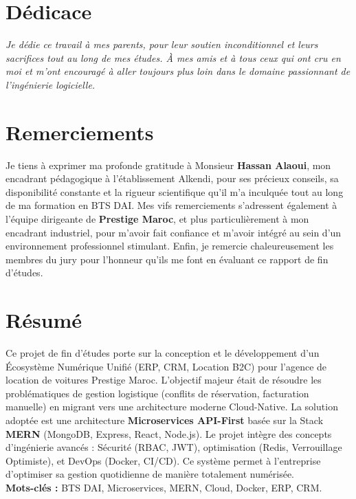 
\chapter*{Dédicace}
\textit{Je dédie ce travail à mes parents, pour leur soutien inconditionnel et leurs sacrifices tout au long de mes études. À mes amis et à tous ceux qui ont cru en moi et m'ont encouragé à aller toujours plus loin dans le domaine passionnant de l'ingénierie logicielle.}

\chapter*{Remerciements}
Je tiens à exprimer ma profonde gratitude à Monsieur \textbf{Hassan Alaoui}, mon encadrant pédagogique à l'établissement Alkendi, pour ses précieux conseils, sa disponibilité constante et la rigueur scientifique qu'il m'a inculquée tout au long de ma formation en BTS DAI.
Mes vifs remerciements s'adressent également à l'équipe dirigeante de \textbf{Prestige Maroc}, et plus particulièrement à mon encadrant industriel, pour m'avoir fait confiance et m'avoir intégré au sein d'un environnement professionnel stimulant. Enfin, je remercie chaleureusement les membres du jury pour l'honneur qu'ils me font en évaluant ce rapport de fin d'études.

\chapter*{Résumé}
Ce projet de fin d'études porte sur la conception et le développement d'un Écosystème Numérique Unifié (ERP, CRM, Location B2C) pour l'agence de location de voitures Prestige Maroc. L'objectif majeur était de résoudre les problématiques de gestion logistique (conflits de réservation, facturation manuelle) en migrant vers une architecture moderne Cloud-Native.
La solution adoptée est une architecture \textbf{Microservices API-First} basée sur la Stack \textbf{MERN} (MongoDB, Express, React, Node.js). Le projet intègre des concepts d'ingénierie avancés : Sécurité (RBAC, JWT), optimisation (Redis, Verrouillage Optimiste), et DevOps (Docker, CI/CD). Ce système permet à l'entreprise d'optimiser sa gestion quotidienne de manière totalement numérisée. \\
\textbf{Mots-clés :} BTS DAI, Microservices, MERN, Cloud, Docker, ERP, CRM.

